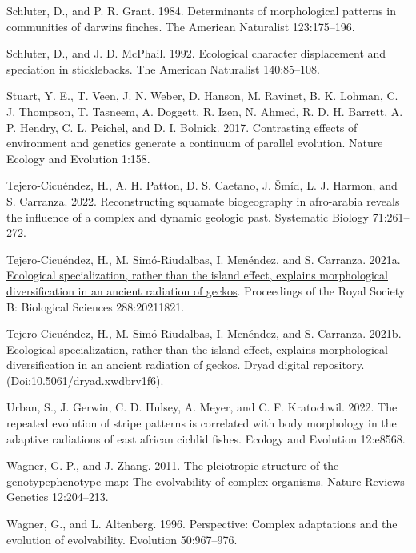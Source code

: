 \documentclass[
  11pt,
]{article}
\newlength{\cslhangindent}
\newlength{\cslentryspacingunit} %
\newenvironment{CSLReferences}[2] %
 {%
  \setlength{\parindent}{0pt}
  \ifodd #1
  \let\oldpar\par
  \def\par{\hangindent=\cslhangindent\oldpar}
  \fi
  \setlength{\parskip}{#2\cslentryspacingunit}
 }%
 {}
\begin{document}
\begin{CSLReferences}{1}{0}
\leavevmode{}%
Schluter, D., and P. R. Grant. 1984. Determinants of morphological
patterns in communities of darwin{\textquotesingle}s finches. The
American Naturalist 123:175--196.

\leavevmode{}%
Schluter, D., and J. D. McPhail. 1992. Ecological character displacement
and speciation in sticklebacks. The American Naturalist 140:85--108.

\leavevmode{}%
Stuart, Y. E., T. Veen, J. N. Weber, D. Hanson, M. Ravinet, B. K.
Lohman, C. J. Thompson, T. Tasneem, A. Doggett, R. Izen, N. Ahmed, R. D.
H. Barrett, A. P. Hendry, C. L. Peichel, and D. I. Bolnick. 2017.
Contrasting effects of environment and genetics generate a continuum of
parallel evolution. Nature Ecology and Evolution 1:158.

\leavevmode{}%
Tejero-Cicuéndez, H., A. H. Patton, D. S. Caetano, J. Šmíd, L. J.
Harmon, and S. Carranza. 2022. Reconstructing squamate biogeography in
afro-arabia reveals the influence of a complex and dynamic geologic
past. Systematic Biology 71:261--272.

\leavevmode{}%
Tejero-Cicuéndez, H., M. Simó-Riudalbas, I. Menéndez, and S. Carranza.
2021a. \href{https://doi.org/10.1098/rspb.2021.1821}{Ecological
specialization, rather than the island effect, explains morphological
diversification in an ancient radiation of geckos}. Proceedings of the
Royal Society B: Biological Sciences 288:20211821.

\leavevmode{}%
Tejero-Cicuéndez, H., M. Simó-Riudalbas, I. Menéndez, and S. Carranza.
2021b. Ecological specialization, rather than the island effect,
explains morphological diversification in an ancient radiation of
geckos. Dryad digital repository. (Doi:10.5061/dryad.xwdbrv1f6).

\leavevmode{}%
Urban, S., J. Gerwin, C. D. Hulsey, A. Meyer, and C. F. Kratochwil.
2022. The repeated evolution of stripe patterns is correlated with body
morphology in the adaptive radiations of east african cichlid fishes.
Ecology and Evolution 12:e8568.

\leavevmode{}%
Wagner, G. P., and J. Zhang. 2011. The pleiotropic structure of the
genotype{\textendash}phenotype map: The evolvability of complex
organisms. Nature Reviews Genetics 12:204--213.

\leavevmode{}%
Wagner, G., and L. Altenberg. 1996. Perspective: Complex adaptations and
the evolution of evolvability. Evolution 50:967--976.

\end{CSLReferences}
\end{document}
